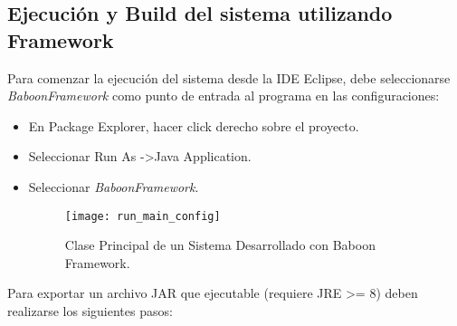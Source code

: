 \subsection {Ejecución y Build del sistema utilizando \nombreFramework
Framework}

Para comenzar la ejecución del sistema desde la IDE Eclipse, debe seleccionarse
\emph{BaboonFramework} como punto de entrada al programa en las configuraciones:
    \begin{itemize}
      \item En Package Explorer, hacer click derecho sobre el proyecto.
      \item Seleccionar Run As -\textgreater Java Application.
      \item Seleccionar \emph{BaboonFramework}.
      \begin{figure}[H]
            \centering
            \texttt{[image: run\_main\_config]}
            \caption{Clase Principal de un Sistema Desarrollado con Baboon Framework.}
            \label{fig:baboon_main}
      \end{figure}
    \end{itemize}

Para exportar un archivo JAR que ejecutable (requiere JRE \textgreater= 8) deben
realizarse los siguientes pasos:

